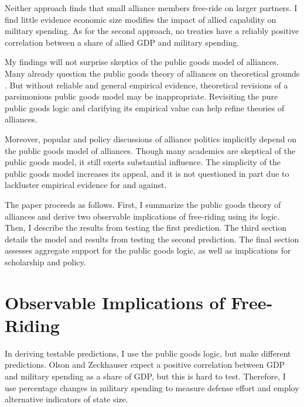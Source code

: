 \documentclass[12pt]{article}
\begin{document}
Neither approach finds that small alliance members free-ride on larger partners. 
I find little evidence economic size modifies the impact of allied capability on military spending.
As for the second approach, no treaties have a reliably positive correlation between a share of allied GDP and military spending. 


My findings will not surprise skeptics of the public goods model of alliances. 
Many already question the public goods theory of alliances on theoretical grounds \citep{Palmer1990, SandlerHartley2001, Norrlof2010, NiouZeigler2019}. 
But without reliable and general empirical evidence, theoretical revisions of a parsimonious public goods model may be inappropriate.
Revisiting the pure public goods logic and clarifying its empirical value can help refine theories of alliances. 


Moreover, popular and policy discussions of alliance politics implicitly depend on the public goods model of alliances. 
Though many academics are skeptical of the public goods model, it still exerts substantial influence. 
The simplicity of the public goods model increases its appeal, and it is not questioned in part due to lackluster empirical evidence for and against. 


The paper proceeds as follows.
First, I summarize the public goods theory of alliances and derive two observable implications of free-riding using its logic.
Then, I describe the results from testing the first prediction.
The third section details the model and results from testing the second prediction. 
The final section assesses aggregate support for the public goods logic, as well as implications for scholarship and policy. 



\section{Observable Implications of Free-Riding}

In deriving testable predictions, I use the public goods logic, but make different predictions.
Olson and Zeckhauser expect a positive correlation between GDP and military spending as a share of GDP, but this is hard to test. 
Therefore, I use percentage changes in military spending to measure defense effort and employ alternative indicators of state size. 
\end{document}
